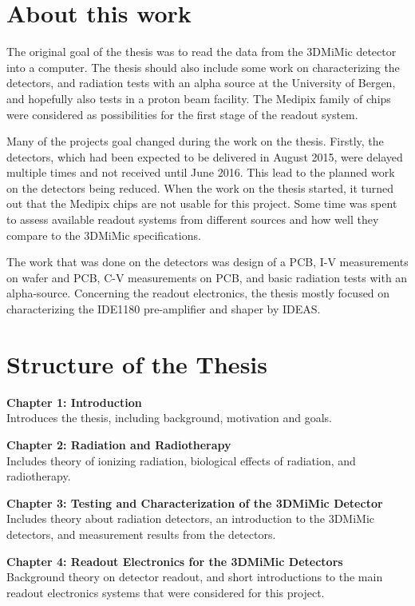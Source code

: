 \documentclass[../main/thesis.tex]{subfiles}
\begin{document}
\newpage
\section{About this work}
\label{i-goal}

The original goal of the thesis was to read the data from the 3DMiMic detector into a computer. The thesis should also include some work on characterizing the detectors, and radiation tests with an alpha source at the University of Bergen, and hopefully also tests in a proton beam facility. The Medipix family of chips were considered as possibilities for the first stage of the readout system.

Many of the projects goal changed during the work on the thesis. Firstly, the detectors, which had been expected to be delivered in August 2015, were delayed multiple times and not received until June 2016. This lead to the planned work on the detectors being reduced. When the work on the thesis started, it turned out that the Medipix chips are not usable for this project. Some time was spent to assess available readout systems from different sources and how well they compare to the 3DMiMic specifications.

The work that was done on the detectors was design of a PCB, I-V measurements on wafer and PCB, C-V measurements on PCB, and basic radiation tests with an alpha-source. Concerning the readout electronics, the thesis mostly focused on characterizing the IDE1180 pre-amplifier and shaper by IDEAS.

\section{Structure of the Thesis}
\label{i-structure}
\textbf{Chapter 1: Introduction}\\
Introduces the thesis, including background, motivation and goals.

\textbf{Chapter 2: Radiation and Radiotherapy}\\
Includes theory of ionizing radiation, biological effects of radiation, and radiotherapy.

\textbf{Chapter 3: Testing and Characterization of the 3DMiMic Detector}\\
Includes theory about radiation detectors, an introduction to the 3DMiMic detectors, and measurement results from the detectors.

\textbf{Chapter 4: Readout Electronics for the 3DMiMic Detectors}\\
Background theory on detector readout, and short introductions to the main readout electronics systems that were considered for this project.
\end{document}
